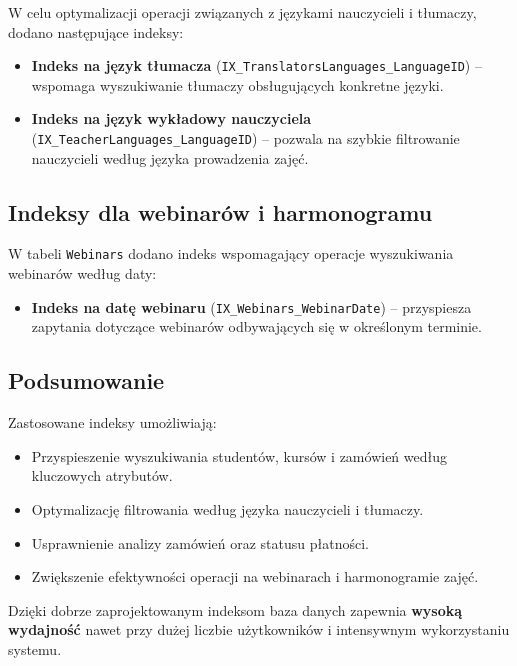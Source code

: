 \documentclass[12pt]{article}
\begin{document}
\noindent W celu optymalizacji operacji związanych z językami nauczycieli i tłumaczy, dodano następujące indeksy:

\begin{itemize}
    \item \textbf{Indeks na język tłumacza} (\texttt{IX\_TranslatorsLanguages\_LanguageID}) -- wspomaga wyszukiwanie tłumaczy obsługujących konkretne języki.
    \item \textbf{Indeks na język wykładowy nauczyciela} (\texttt{IX\_TeacherLanguages\_LanguageID}) -- pozwala na szybkie filtrowanie nauczycieli według języka prowadzenia zajęć.
\end{itemize}

\subsection{Indeksy dla webinarów i harmonogramu}

\noindent W tabeli \texttt{Webinars} dodano indeks wspomagający operacje wyszukiwania webinarów według daty:

\begin{itemize}
    \item \textbf{Indeks na datę webinaru} (\texttt{IX\_Webinars\_WebinarDate}) -- przyspiesza zapytania dotyczące webinarów odbywających się w określonym terminie.
\end{itemize}

\subsection{Podsumowanie}

\noindent Zastosowane indeksy umożliwiają:
\begin{itemize}
    \item Przyspieszenie wyszukiwania studentów, kursów i zamówień według kluczowych atrybutów.
    \item Optymalizację filtrowania według języka nauczycieli i tłumaczy.
    \item Usprawnienie analizy zamówień oraz statusu płatności.
    \item Zwiększenie efektywności operacji na webinarach i harmonogramie zajęć.
\end{itemize}

\noindent Dzięki dobrze zaprojektowanym indeksom baza danych zapewnia \textbf{wysoką wydajność} nawet przy dużej liczbie użytkowników i intensywnym wykorzystaniu systemu.


\newpage
\end{document}
